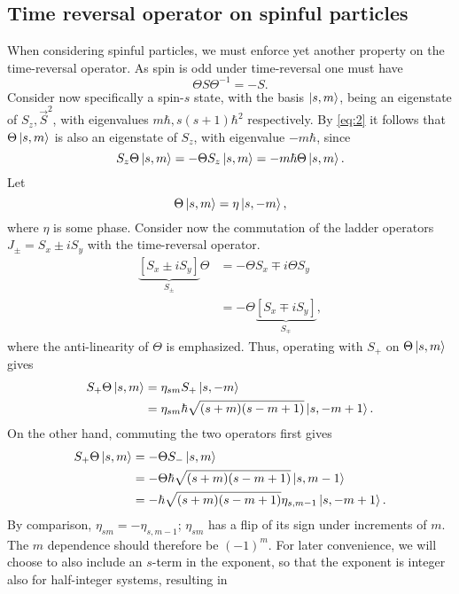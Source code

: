 \subsection{Time reversal operator on spinful particles}
When considering spinful particles, we must enforce yet another property on the time-reversal operator.
As spin is odd under time-reversal one must have
\begin{equation}
  \label{eq:2}
  \Theta S \Theta^{-1} = -S.
\end{equation}
Consider now specifically a spin-$s$ state, with the basis $\ket{s, m}$, being an eigenstate of $S_z, \vec{S}^2$, with eigenvalues $m\hbar, s(s+1) \hbar^2$ respectively.
By \cref{eq:2} it follows that $\Theta \ket{s, m}$ is also an  eigenstate of $S_z$, with eigenvalue $-m \hbar $, since
\begin{equation}
  S_z \Theta \ket{s, m} = -\Theta  S_z \ket{s, m} = -m \hbar \Theta \ket{s, m}.
\end{equation}
Let
\[
  \Theta \ket{s, m} = \eta \ket{s, -m},
\]
where $\eta $ is some phase.
Consider now the commutation of the ladder operators $J_{\pm} = S_x \pm i S_y$ with the time-reversal operator.
\begin{equation}
  \begin{split}
    \underbrace{\left[ S_x \pm i S_y \right]}_{S_{\pm}} \Theta  &= -\Theta S_x \mp i \Theta S_y\\
    &= -\Theta \underbrace{\left[ S_x \mp iS_y \right]}_{S_{\mp}},
  \end{split}
\end{equation}
where the anti-linearity of $\Theta $ is emphasized.
Thus, operating with $S_+$ on $\Theta \ket{s, m}$ gives
\begin{align}
  S_+ \Theta \ket{s, m} &= \eta_{sm} S_+ \ket{s, -m}\\
  &= \eta_{sm} \hbar \sqrt{(s+m) (s-m+1)} \ket{s, -m +  1}.
\end{align}
On the other hand, commuting the two operators first gives
\begin{align}
  S_+ \Theta  \ket{s, m} &= - \Theta  S_- \ket{s, m}\\
                         &= - \Theta \hbar \sqrt{(s+m)(s-m+1)} \ket{s, m-1}\\
  &= -\hbar \sqrt{(s+m)(s-m+1)} \eta_{s, m-1} \ket{s, -m + 1}.
\end{align}
By comparison, $\eta _{sm}= - \eta _{s, m-1}$; $\eta _{sm}$ has a flip of its sign under increments of $m$.
The $m$ dependence should therefore be $(-1)^m$.
For later convenience, we will choose to also include an $s$-term in the exponent, so that the exponent is integer also for half-integer systems, resulting in
